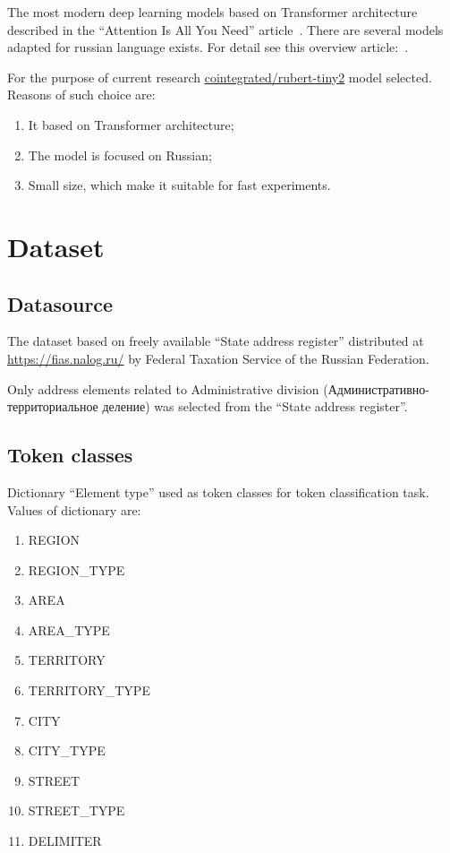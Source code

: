 \documentclass{article}
\begin{document}
The most modern deep learning models based on Transformer architecture described in the ``Attention Is All You Need'' article~\cite{vaswani2023attention}.
There are several models adapted for russian language exists.
For detail see this overview article:~\cite{zmitrovich2024family}.

For the purpose of current research \href{https://huggingface.co/cointegrated/rubert-tiny2}{cointegrated/rubert-tiny2} model selected.
Reasons of such choice are:
\begin{enumerate}
    \item It based on Transformer architecture;
    \item The model is focused on Russian;
    \item Small size, which make it suitable for fast experiments.
\end{enumerate}


\section{Dataset}

\subsection{Datasource}
The dataset based on freely available ``State address register'' distributed at \url{https://fias.nalog.ru/} by Federal Taxation Service of the Russian Federation.

Only address elements related to Administrative division (Административно-территориальное деление) was selected from the ``State address register''.

\subsection{Token classes}

Dictionary ``Element type'' used as token classes for token classification task.
Values of dictionary are:
\begin{enumerate}
    \item REGION
    \item REGION\_TYPE
    \item AREA
    \item AREA\_TYPE
    \item TERRITORY
    \item TERRITORY\_TYPE
    \item CITY
    \item CITY\_TYPE
    \item STREET
    \item STREET\_TYPE
    \item DELIMITER
\end{enumerate}
\end{document}
